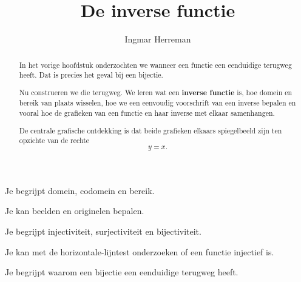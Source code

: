 \documentclass{ximera}
\title{De inverse functie}
\author{Ingmar Herreman}
\begin{document}









\begin{abstract}
In het vorige hoofdstuk onderzochten we wanneer een functie een eenduidige
terugweg heeft. Dat is precies het geval bij een bijectie.

Nu construeren we die terugweg. We leren wat een \textbf{inverse functie} is,
hoe domein en bereik van plaats wisselen, hoe we een eenvoudig voorschrift
van een inverse bepalen en vooral hoe de grafieken van een functie en haar
inverse met elkaar samenhangen.

De centrale grafische ontdekking is dat beide grafieken elkaars spiegelbeeld
zijn ten opzichte van de rechte
\[
y=x.
\]
\end{abstract}

\maketitle

\begin{voorkennis}
    \item Je begrijpt domein, codomein en bereik.
    \item Je kan beelden en originelen bepalen.
    \item Je begrijpt injectiviteit, surjectiviteit en bijectiviteit.
    \item Je kan met de horizontale-lijntest onderzoeken of een functie injectief is.
    \item Je begrijpt waarom een bijectie een eenduidige terugweg heeft.
\end{voorkennis}
\end{document}
